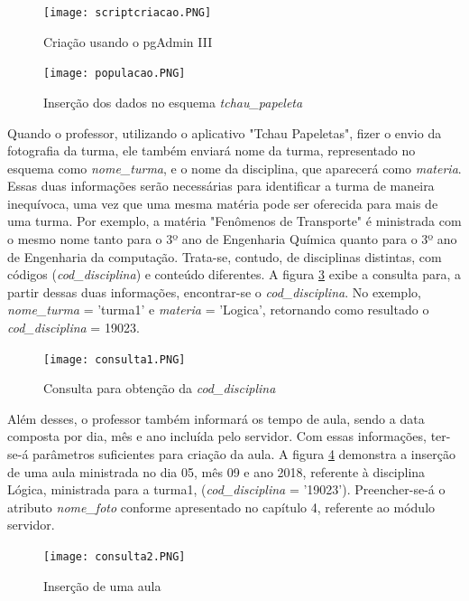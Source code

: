 \begin{figure}[!ht]
	\centering
\texttt{[image: scriptcriacao.PNG]}   
	\caption{Criação usando o pgAdmin III}
	\label{fig:figura60a}
\end{figure}

\begin{figure}[!ht]
	\centering
\texttt{[image: populacao.PNG]}   
	\caption{Inserção dos dados no esquema \textit{tchau\_papeleta}}
	\label{fig:figura61a}
\end{figure}

Quando o professor, utilizando o aplicativo "Tchau Papeletas", fizer o envio da fotografia da turma, ele também enviará nome da turma, representado no esquema como \textit{nome\_turma}, e o nome da disciplina, que aparecerá como \textit{materia}. Essas duas informações serão necessárias para identificar a turma de maneira inequívoca, uma vez que  uma mesma matéria pode ser oferecida para mais de uma turma. Por exemplo, a matéria "Fenômenos de Transporte" é ministrada com o mesmo nome tanto para o 3º ano de Engenharia Química quanto para o 3º ano de Engenharia da computação. Trata-se, contudo, de disciplinas distintas, com códigos (\textit{cod\_disciplina}) e conteúdo diferentes. A figura \ref{fig:figura62a} exibe a consulta para, a partir dessas duas informações, encontrar-se o \textit{cod\_disciplina}. No exemplo, \textit{nome\_turma} = 'turma1' e \textit{materia} = 'Logica', retornando como resultado o \textit{cod\_disciplina} = 19023.

\begin{figure}[!ht]
	\centering
\texttt{[image: consulta1.PNG]}   
	\caption{Consulta para obtenção da \textit{cod\_disciplina}}
	\label{fig:figura62a}
\end{figure}

Além desses, o professor também informará os tempo de aula, sendo a data composta por dia, mês e ano incluída pelo servidor. Com essas informações, ter-se-á parâmetros suficientes para criação da aula. A figura \ref{fig:figura63a} demonstra a inserção de uma aula ministrada no dia 05, mês 09 e ano 2018, referente à disciplina Lógica, ministrada para a turma1, (\textit{cod\_disciplina} = '19023'). Preencher-se-á o atributo \textit{nome\_foto} conforme apresentado no capítulo 4, referente ao módulo servidor. 

\begin{figure}[!ht]
	\centering
\texttt{[image: consulta2.PNG]}   
	\caption{Inserção de uma aula}
	\label{fig:figura63a}
\end{figure}

